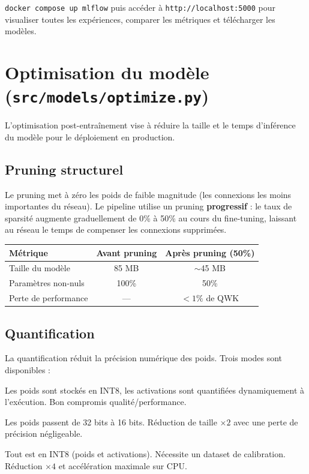 \documentclass[11pt,a4paper]{article}
\begin{document}
\begin{tipbox}
\texttt{docker compose up mlflow} puis accéder à \texttt{http://localhost:5000} pour visualiser toutes les expériences, comparer les métriques et télécharger les modèles.
\end{tipbox}

\section{Optimisation du modèle (\texttt{src/models/optimize.py})}

L'optimisation post-entraînement vise à réduire la taille et le temps d'inférence du modèle pour le déploiement en production.

\subsection{Pruning structurel}

Le pruning met à zéro les poids de faible magnitude (les connexions les moins importantes du réseau). Le pipeline utilise un pruning \textbf{progressif} : le taux de sparsité augmente graduellement de 0\% à 50\% au cours du fine-tuning, laissant au réseau le temps de compenser les connexions supprimées.

\begin{center}
\renewcommand{\arraystretch}{1.3}
\begin{tabular}{lcc}
\toprule
\textbf{Métrique} & \textbf{Avant pruning} & \textbf{Après pruning (50\%)} \\
\midrule
Taille du modèle & 85 MB & $\sim$45 MB \\
Paramètres non-nuls & 100\% & 50\% \\
Perte de performance & --- & $< 1\%$ de QWK \\
\bottomrule
\end{tabular}
\end{center}

\subsection{Quantification}

La quantification réduit la précision numérique des poids. Trois modes sont disponibles :

\begin{description}[leftmargin=2em]
  \item[Dynamic (INT8)] Les poids sont stockés en INT8, les activations sont quantifiées dynamiquement à l'exécution. Bon compromis qualité/performance.
  \item[Float16] Les poids passent de 32 bits à 16 bits. Réduction de taille $\times 2$ avec une perte de précision négligeable.
  \item[Full INT8] Tout est en INT8 (poids et activations). Nécessite un dataset de calibration. Réduction $\times 4$ et accélération maximale sur CPU.
\end{description}
\end{document}
